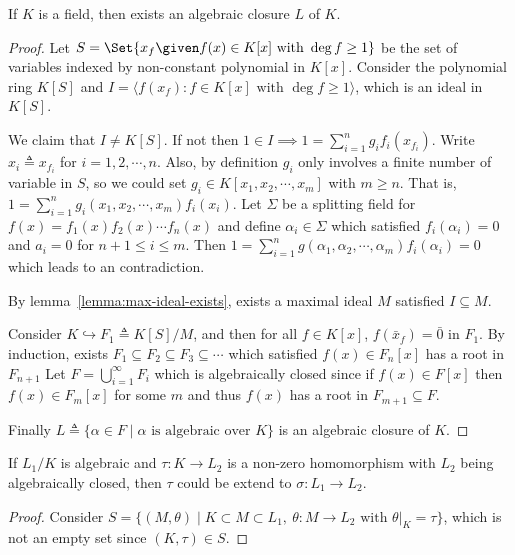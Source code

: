 \begin{theorem}
  If $K$ is a field, then exists an algebraic closure $L$ of $K$.

  \begin{proof}
    Let $S = \Set{x_f \given f(x) \in K[x] \text{ with } \deg f \geq 1}$ be the set of variables indexed by non-constant
    polynomial in $K[x]$. Consider the polynomial ring $K[S]$ and $I = \langle f(x_f) : f \in K[x] \text{ with } \deg f \geq 1 \rangle$,
    which is an ideal in $K[S]$.

    We claim that $I \neq K[S]$. If not then $1 \in I \implies 1 = \sum_{i = 1}^n g_i f_i(x_{f_i})$.
    Write $x_i \triangleq x_{f_i}$ for $i = 1, 2, \cdots, n$. Also, by definition $g_i$ only involves a finite number of
    variable in $S$, so we could set $g_i \in K[x_1, x_2, \cdots, x_m]$ with $m \geq n$. That is, $1 = \sum_{i = 1}^n g_i(x_1, x_2,
    \cdots, x_m) f_i(x_i)$. Let $\Sigma$ be a splitting field for $f(x) = f_1(x) f_2(x) \cdots f_n(x)$ and define $\alpha_i \in \Sigma$
    which satisfied $f_i(\alpha_i) = 0$ and $a_i = 0$ for $n+1 \leq i \leq m$. Then
    $1 = \sum_{i = 1}^n g(\alpha_1, \alpha_2, \cdots, \alpha_m) f_i(\alpha_i) = 0$ which leads to an contradiction.

    By lemma~\ref{lemma:max-ideal-exists}, exists a maximal ideal $M$ satisfied $I \subseteq M$.

    Consider $K \hookrightarrow F_1 \triangleq K[S] / M$, and then for all $f \in K[x]$, $f(\bar{x}_f) = \bar{0}$ in $F_1$.
    By induction, exists $F_1 \subseteq F_2 \subseteq F_3 \subseteq \cdots$ which satisfied $f(x) \in F_n[x]$ has a root in $F_{n+1}$
    Let $F = \bigcup_{i = 1}^\infty F_i$ which is algebraically closed since if $f(x) \in F[x]$ then $f(x) \in F_m[x]$
    for some $m$ and thus $f(x)$ has a root in $F_{m+1} \subseteq F$.

    Finally $L \triangleq \{ \alpha \in F \mid \alpha \text{ is algebraic over } K \}$ is an algebraic closure of $K$.
  \end{proof}

  \begin{lemma} \label{lemma:homo-extend-to-alg-closed-extension}
    If $L_1 / K$ is algebraic and $\tau: K \to L_2$ is a non-zero homomorphism with $L_2$ being algebraically closed,
    then $\tau$ could be extend to $\sigma: L_1 \to L_2$.

    \begin{proof}
      Consider $S = \{ (M, \theta) \mid K \subset M \subset L_1,\ \theta: M \to L_2 \text{ with } \theta\big|_K = \tau\}$,
      which is not an empty set since $(K, \tau) \in S$.


\end{proof}
\end{lemma}
\end{theorem}
